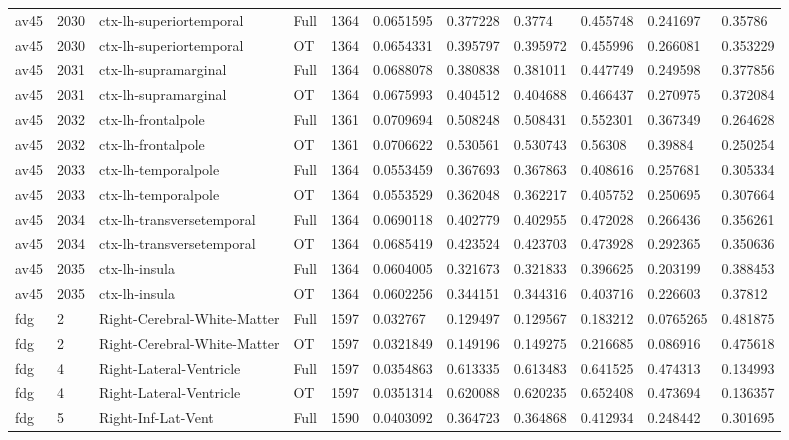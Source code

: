 \begin{landscape}
\begin{longtable}{lllllllllll}
av45 & 2030 & ctx-lh-superiortemporal & Full & 1364 & 0.0651595 & 0.377228 & 0.3774 & 0.455748 & 0.241697 & 0.35786 \\
av45 & 2030 & ctx-lh-superiortemporal & OT & 1364 & 0.0654331 & 0.395797 & 0.395972 & 0.455996 & 0.266081 & 0.353229 \\
av45 & 2031 & ctx-lh-supramarginal & Full & 1364 & 0.0688078 & 0.380838 & 0.381011 & 0.447749 & 0.249598 & 0.377856 \\
av45 & 2031 & ctx-lh-supramarginal & OT & 1364 & 0.0675993 & 0.404512 & 0.404688 & 0.466437 & 0.270975 & 0.372084 \\
av45 & 2032 & ctx-lh-frontalpole & Full & 1361 & 0.0709694 & 0.508248 & 0.508431 & 0.552301 & 0.367349 & 0.264628 \\
av45 & 2032 & ctx-lh-frontalpole & OT & 1361 & 0.0706622 & 0.530561 & 0.530743 & 0.56308 & 0.39884 & 0.250254 \\
av45 & 2033 & ctx-lh-temporalpole & Full & 1364 & 0.0553459 & 0.367693 & 0.367863 & 0.408616 & 0.257681 & 0.305334 \\
av45 & 2033 & ctx-lh-temporalpole & OT & 1364 & 0.0553529 & 0.362048 & 0.362217 & 0.405752 & 0.250695 & 0.307664 \\
av45 & 2034 & ctx-lh-transversetemporal & Full & 1364 & 0.0690118 & 0.402779 & 0.402955 & 0.472028 & 0.266436 & 0.356261 \\
av45 & 2034 & ctx-lh-transversetemporal & OT & 1364 & 0.0685419 & 0.423524 & 0.423703 & 0.473928 & 0.292365 & 0.350636 \\
av45 & 2035 & ctx-lh-insula & Full & 1364 & 0.0604005 & 0.321673 & 0.321833 & 0.396625 & 0.203199 & 0.388453 \\
av45 & 2035 & ctx-lh-insula & OT & 1364 & 0.0602256 & 0.344151 & 0.344316 & 0.403716 & 0.226603 & 0.37812 \\
fdg & 2 & Right-Cerebral-White-Matter & Full & 1597 & 0.032767 & 0.129497 & 0.129567 & 0.183212 & 0.0765265 & 0.481875 \\
fdg & 2 & Right-Cerebral-White-Matter & OT & 1597 & 0.0321849 & 0.149196 & 0.149275 & 0.216685 & 0.086916 & 0.475618 \\
fdg & 4 & Right-Lateral-Ventricle & Full & 1597 & 0.0354863 & 0.613335 & 0.613483 & 0.641525 & 0.474313 & 0.134993 \\
fdg & 4 & Right-Lateral-Ventricle & OT & 1597 & 0.0351314 & 0.620088 & 0.620235 & 0.652408 & 0.473694 & 0.136357 \\
fdg & 5 & Right-Inf-Lat-Vent & Full & 1590 & 0.0403092 & 0.364723 & 0.364868 & 0.412934 & 0.248442 & 0.301695 \\

\end{longtable}
\end{landscape}

